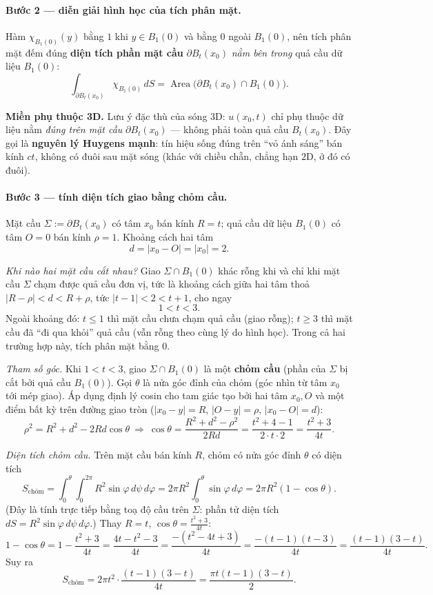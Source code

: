 \paragraph{Bước 2 --- diễn giải hình học của tích phân mặt.}\leavevmode

Hàm $\chi_{B_1(0)}(y)$ bằng $1$ khi $y\in B_1(0)$ và bằng $0$ ngoài $B_1(0)$, nên tích phân mặt đếm đúng \textbf{diện tích phần mặt cầu} $\partial B_t(x_0)$ \emph{nằm bên trong} quả cầu dữ liệu $B_1(0)$:
\[
  \int_{\partial B_t(x_0)}\!\chi_{B_1(0)}\,dS=\operatorname{Area}\!\Big(\partial B_t(x_0)\cap B_1(0)\Big).
\]

\textbf{Miền phụ thuộc 3D.} Lưu ý đặc thù của sóng $3$D: $u(x_0,t)$ chỉ phụ thuộc dữ liệu nằm \emph{đúng trên mặt cầu} $\partial B_t(x_0)$ --- không phải toàn quả cầu $B_t(x_0)$. Đây gọi là \textbf{nguyên lý Huygens mạnh}: tín hiệu sống đúng trên ``vỏ ánh sáng'' bán kính $ct$, không có đuôi sau mặt sóng (khác với chiều chẵn, chẳng hạn $2$D, ở đó có đuôi).

\paragraph{Bước 3 --- tính diện tích giao bằng chỏm cầu.}\leavevmode

Mặt cầu $\Sigma:=\partial B_t(x_0)$ có tâm $x_0$ bán kính $R=t$; quả cầu dữ liệu $B_1(0)$ có tâm $O=0$ bán kính $\rho=1$. Khoảng cách hai tâm
\[
  d=|x_0-O|=|x_0|=2.
\]

\emph{Khi nào hai mặt cầu cắt nhau?} Giao $\Sigma\cap B_1(0)$ khác rỗng khi và chỉ khi mặt cầu $\Sigma$ chạm được quả cầu đơn vị, tức là khoảng cách giữa hai tâm thoả $|R-\rho|<d<R+\rho$, tức $|t-1|<2<t+1$, cho ngay
\[
  1<t<3.
\]
Ngoài khoảng đó: $t\le 1$ thì mặt cầu chưa chạm quả cầu (giao rỗng); $t\ge 3$ thì mặt cầu đã ``đi qua khỏi'' quả cầu (vẫn rỗng theo cùng lý do hình học). Trong cả hai trường hợp này, tích phân mặt bằng $0$.

\emph{Tham số góc.} Khi $1<t<3$, giao $\Sigma\cap B_1(0)$ là một \textbf{chỏm cầu} (phần của $\Sigma$ bị cắt bởi quả cầu $B_1(0)$). Gọi $\theta$ là nửa góc đỉnh của chỏm (góc nhìn từ tâm $x_0$ tới mép giao). Áp dụng định lý cosin cho tam giác tạo bởi hai tâm $x_0,O$ và một điểm bất kỳ trên đường giao tròn ($|x_0-y|=R$, $|O-y|=\rho$, $|x_0-O|=d$):
\[
  \rho^2=R^2+d^2-2Rd\cos\theta\ \Longrightarrow\ \cos\theta=\frac{R^2+d^2-\rho^2}{2Rd}=\frac{t^2+4-1}{2\cdot t\cdot 2}=\frac{t^2+3}{4t}.
\]

\emph{Diện tích chỏm cầu.} Trên mặt cầu bán kính $R$, chỏm có nửa góc đỉnh $\theta$ có diện tích
\[
  S_{\text{chỏm}}=\int_0^{\theta}\!\!\int_0^{2\pi} R^2\sin\varphi\,d\psi\,d\varphi=2\pi R^2\int_0^\theta\!\sin\varphi\,d\varphi=2\pi R^2(1-\cos\theta).
\]
(Đây là tính trực tiếp bằng toạ độ cầu trên $\Sigma$: phần tử diện tích $dS=R^2\sin\varphi\,d\psi\,d\varphi$.) Thay $R=t$, $\cos\theta=\tfrac{t^2+3}{4t}$:
\[
  1-\cos\theta=1-\frac{t^2+3}{4t}=\frac{4t-t^2-3}{4t}=\frac{-(t^2-4t+3)}{4t}=\frac{-(t-1)(t-3)}{4t}=\frac{(t-1)(3-t)}{4t}.
\]
Suy ra
\[
  S_{\text{chỏm}}=2\pi t^2\cdot\frac{(t-1)(3-t)}{4t}=\frac{\pi t(t-1)(3-t)}{2}.
\]

